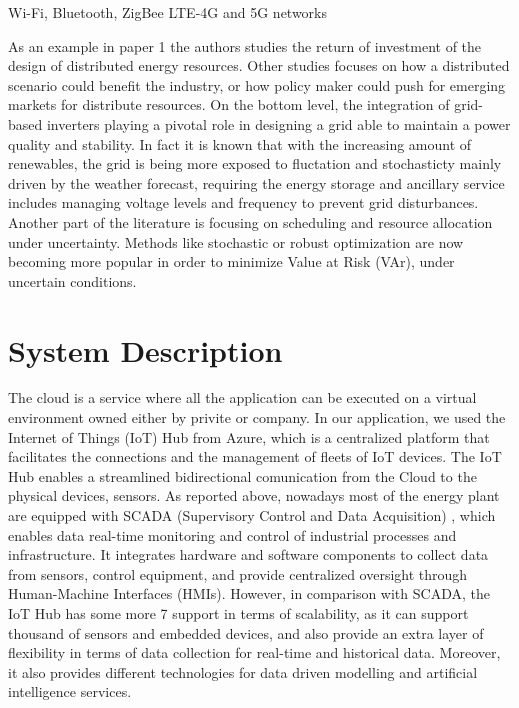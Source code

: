 Wi-Fi, Bluetooth, ZigBee \cite{karunarathne2018wireless} LTE-4G and 5G networks \cite{li20185g}



As an example in paper 1 the authors studies the return of investment of the design
of distributed energy resources. Other studies focuses on how a distributed scenario could benefit the industry, 
or how policy maker could push for emerging markets for distribute resources. On the bottom level, the integration of grid-based inverters
playing a pivotal role in designing a grid able to maintain a power quality and stability.
In fact it is known that with the increasing amount of renewables, the grid is being more exposed to fluctation 
and stochasticty mainly driven by the weather forecast, requiring the energy storage and ancillary service includes 
managing voltage levels and frequency to prevent grid disturbances.
Another part of the literature is focusing on scheduling and resource allocation under uncertainty. 
Methods like stochastic or robust optimization are now becoming more popular in order to minimize Value at Risk (VAr), under uncertain conditions. 

\section{System Description}
The cloud is a service where all the application can be executed on a virtual 
environment owned either by privite or company. In our application, we used the 
Internet of Things (IoT) Hub from Azure, which is a centralized platform that facilitates the 
connections and the management of fleets of IoT devices. The IoT Hub enables a streamlined 
bidirectional comunication from the Cloud to the physical devices, sensors.
As reported above, nowadays most of the energy plant are equipped with SCADA 
(Supervisory Control and Data Acquisition) \cite{daneels1999scada}, which enables data 
real-time monitoring and control of industrial processes and infrastructure.
It integrates hardware and 
software components to collect data from sensors, control equipment, and provide 
centralized oversight through Human-Machine Interfaces (HMIs). However, in comparison with SCADA, the IoT Hub has some more 7
support in terms of scalability, as it can support thousand of sensors and embedded devices, and also provide an extra layer of 
flexibility in terms of data collection for real-time and historical data. Moreover, it also provides different technologies for 
data driven modelling and artificial intelligence services. 

